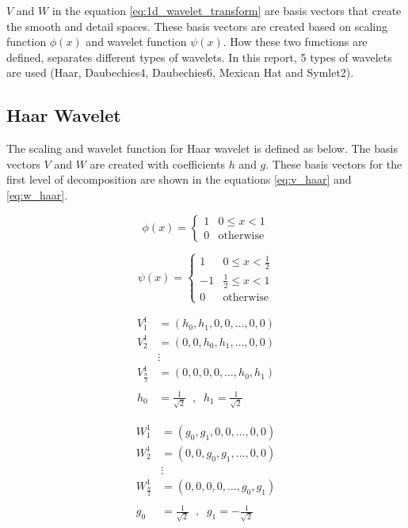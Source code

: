 \documentclass[12pt]{article}
\begin{document}
	$V$ and $W$ in the equation \ref{eq:1d_wavelet_transform} are basis vectors that create the smooth and detail spaces. These basis vectors are created based on scaling function $\phi(x)$ and wavelet function $\psi(x)$. How these two functions are defined, separates different types of wavelets. In this report, 5 types of wavelets are used (Haar, Daubechies4, Daubechies6, Mexican Hat and Symlet2).

	\subsection{Haar Wavelet}
	
	The scaling and wavelet function for Haar wavelet is defined as below. The basis vectors $V$ and $W$ are created with coefficients $h$ and $g$. These basis vectors for the first level of decomposition are shown in the equations \ref{eq:v_haar} and \ref{eq:w_haar}.
	
	\begin{equation}
		\phi(x) = 
		\begin{cases} 
			1 &  0 \leq x < 1 \\
			0 & \text{otherwise}
		\end{cases}
		\label{eq:scalingfunc_haar}
	\end{equation}
	
	\begin{equation}
		\psi(x) = 
		\begin{cases} 
			1 &  0 \leq x < \frac{1}{2} \\
			-1 &  \frac{1}{2} \leq x < 1 \\
			0 & \text{otherwise}
		\end{cases}
		\label{eq:waveletfunc_haar}
	\end{equation}
	
	\begin{equation}
		\begin{aligned}
			V_1^1 &= (h_0, h_1, 0, 0, \dots, 0, 0) \\
			V_2^1 &= (0, 0, h_0, h_1, \dots, 0, 0) \\
			&\vdots \\
			V_{\frac{n}{2}}^1 &= (0, 0, 0, 0, \dots, h_0, h_1)\\
			\\
			h_0 &= \frac{1}{\sqrt{2}} \;\;,\;\; h_1 = \frac{1}{\sqrt{2}}
		\end{aligned}
		\label{eq:v_haar}
	\end{equation}
	
	\begin{equation}
		\begin{aligned}
			W_1^1 &= (g_0, g_1, 0, 0, \dots, 0, 0) \\
			W_2^1 &= (0, 0, g_0, g_1, \dots, 0, 0) \\
			&\vdots \\
			W_{\frac{n}{2}}^1 &= (0, 0, 0, 0, \dots, g_0, g_1)\\
			\\
			g_0 &= \frac{1}{\sqrt{2}} \;\;,\;\; g_1 = -\frac{1}{\sqrt{2}}
		\end{aligned}
		\label{eq:w_haar}
	\end{equation}
	
\end{document}
